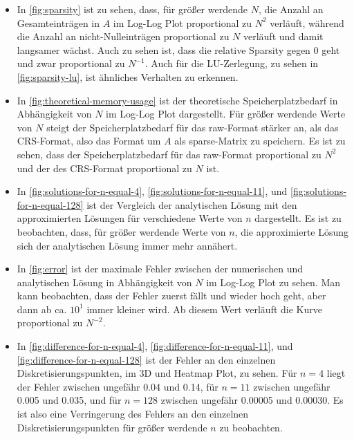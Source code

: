 \documentclass{scrartcl}
\begin{document}
\begin{itemize}
    \item In \autoref{fig:sparsity} ist zu sehen, dass, für größer werdende
          \(N\), die Anzahl an Gesamteinträgen in \(A\) im Log-Log Plot
          proportional zu \(N^2\) verläuft, während die Anzahl an
          nicht-Nulleinträgen proportional zu \(N\) verläuft und damit
          langsamer wächst. Auch zu sehen ist, dass die relative Sparsity gegen
          0 geht und zwar proportional zu \(N^{-1}\). Auch für die
          LU-Zerlegung, zu sehen in \autoref{fig:sparsity-lu}, ist ähnliches
          Verhalten zu erkennen.

    \item In \autoref{fig:theoretical-memory-usage} ist der theoretische
          Speicherplatzbedarf in Abhängigkeit von \(N\) im Log-Log Plot
          dargestellt. Für größer werdende Werte von \(N\) steigt der
          Speicherplatzbedarf für das raw-Format stärker an, als das
          CRS-Format, also das Format um \(A\) als sparse-Matrix zu speichern.
          Es ist zu sehen, dass der Speicherplatzbedarf für das raw-Format
          proportional zu \(N^2\) und der des CRS-Format proportional zu \(N\)
          ist.

    \item In \autoref{fig:solutions-for-n-equal-4},
          \autoref{fig:solutions-for-n-equal-11}, und
          \autoref{fig:solutions-for-n-equal-128} ist der Vergleich der
          analytischen Lösung mit den approximierten Lösungen für verschiedene
          Werte von \(n\) dargestellt. Es ist zu beobachten, dass, für größer
          werdende Werte von \(n\), die approximierte Lösung sich der
          analytischen Lösung immer mehr annähert.

    \item In \autoref{fig:error} ist der maximale Fehler zwischen der
          numerischen und analytischen Lösung in Abhängigkeit von \(N\) im
          Log-Log Plot zu sehen. Man kann beobachten, dass der Fehler zuerst
          fällt und wieder hoch geht, aber dann ab ca. \(10^{1}\) immer kleiner
          wird. Ab diesem Wert verläuft die Kurve proportional zu \(N^{-2}\).

    \item In \autoref{fig:difference-for-n-equal-4},
          \autoref{fig:difference-for-n-equal-11}, und
          \autoref{fig:difference-for-n-equal-128} ist der Fehler an den
          einzelnen Diskretisierungspunkten, im 3D und Heatmap Plot, zu sehen.
          Für \(n = 4\) liegt der Fehler zwischen ungefähr 0.04 und 0.14, für
          \(n = 11\) zwischen ungefähr 0.005 und 0.035, und für \(n = 128\)
          zwischen ungefähr 0.00005 und 0.00030. Es ist also eine Verringerung
          des Fehlers an den einzelnen Diskretisierungspunkten für größer
          werdende \(n\) zu beobachten.
\end{itemize}
\end{document}

